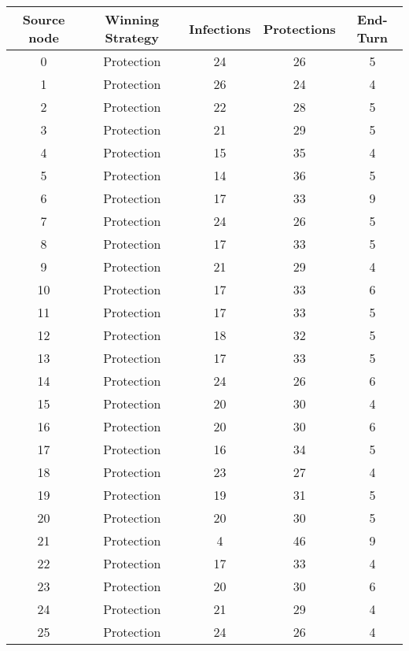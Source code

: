 \documentclass[results.tex]{subfiles}
\begin{document}
\begin{center}
  \begin{tabular}{| c || c | c | c | c |}
    \hline
    {\bfseries Source node} & {\bfseries Winning Strategy} & {\bfseries Infections} & {\bfseries Protections} & {\bfseries End-Turn} \\  %
    \hline\hline
    0 & Protection & 24 & 26 & 5 \\ 
    \hline
    1 & Protection & 26 & 24 & 4 \\ 
    \hline
    2 & Protection & 22 & 28 & 5 \\ 
    \hline
    3 & Protection & 21 & 29 & 5 \\ 
    \hline
    4 & Protection & 15 & 35 & 4 \\ 
    \hline
    5 & Protection & 14 & 36 & 5 \\ 
    \hline
    6 & Protection & 17 & 33 & 9 \\ 
    \hline
    7 & Protection & 24 & 26 & 5 \\ 
    \hline
    8 & Protection & 17 & 33 & 5 \\ 
    \hline
    9 & Protection & 21 & 29 & 4 \\ 
    \hline
    10 & Protection & 17 & 33 & 6 \\ 
    \hline
    11 & Protection & 17 & 33 & 5 \\ 
    \hline
    12 & Protection & 18 & 32 & 5 \\ 
    \hline
    13 & Protection & 17 & 33 & 5 \\ 
    \hline
    14 & Protection & 24 & 26 & 6 \\ 
    \hline
    15 & Protection & 20 & 30 & 4 \\ 
    \hline
    16 & Protection & 20 & 30 & 6 \\ 
    \hline
    17 & Protection & 16 & 34 & 5 \\ 
    \hline
    18 & Protection & 23 & 27 & 4 \\ 
    \hline
    19 & Protection & 19 & 31 & 5 \\ 
    \hline
    20 & Protection & 20 & 30 & 5 \\ 
    \hline
    21 & Protection & 4 & 46 & 9 \\ 
    \hline
    22 & Protection & 17 & 33 & 4 \\ 
    \hline
    23 & Protection & 20 & 30 & 6 \\ 
    \hline
    24 & Protection & 21 & 29 & 4 \\ 
    \hline
    25 & Protection & 24 & 26 & 4 \\ 

\end{tabular}
\end{center}
\end{document}
